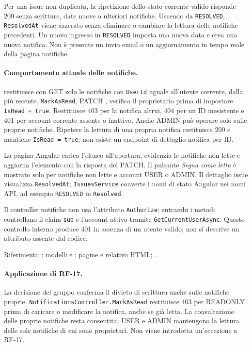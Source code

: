 \documentclass[12pt,a4paper]{article}
\begin{document}
Per una issue non duplicata, la ripetizione dello stato corrente valido risponde 200 senza scritture, date nuove o ulteriori notifiche. Uscendo da \texttt{RESOLVED}, \texttt{ResolvedAt} viene azzerato senza eliminare o cambiare la lettura delle notifiche precedenti. Un nuovo ingresso in \texttt{RESOLVED} imposta una nuova data e crea una nuova notifica. Non è presente un invio email o un aggiornamento in tempo reale della pagina notifiche.

\paragraph{Comportamento attuale delle notifiche.}
 restituisce con GET  solo le notifiche con \texttt{UserId} uguale all'utente corrente, dalla più recente. \texttt{MarkAsRead}, PATCH , verifica il proprietario prima di impostare \texttt{IsRead = true}. Restituisce 403 per la notifica altrui, 404 per un ID inesistente e 401 per account corrente assente o inattivo. Anche ADMIN può operare solo sulle proprie notifiche. Ripetere la lettura di una propria notifica restituisce 200 e mantiene \texttt{IsRead = true}; non esiste un endpoint di dettaglio notifica per ID.

La pagina Angular carica l'elenco all'apertura, evidenzia le notifiche non lette e aggiorna l'elemento con la risposta del PATCH. Il pulsante \emph{Segna come letta} è mostrato solo per notifiche non lette e account USER o ADMIN. Il dettaglio issue visualizza \texttt{ResolvedAt}; \texttt{IssuesService} converte i nomi di stato Angular nei nomi API, ad esempio \texttt{RESOLVED} in \texttt{Resolved}.

Il controller notifiche non usa l'attributo \texttt{Authorize}: entrambi i metodi controllano il claim \texttt{sub} e l'account attivo tramite \texttt{GetCurrentUserAsync}. Questo controllo interno produce 401 in assenza di un utente valido; non si descrive un attributo assente dal codice.

Riferimenti: ; modelli  e ; pagine  e relativo HTML; .

\paragraph{Applicazione di RF-17.}
La decisione del gruppo conferma il divieto di scrittura anche sulle notifiche proprie. \texttt{NotificationsController.MarkAsRead} restituisce 403 per READONLY prima di caricare o modificare la notifica, anche se già letta. La consultazione delle proprie notifiche resta consentita; USER e ADMIN mantengono la lettura delle sole notifiche di cui sono proprietari. Non viene introdotta un'eccezione a RF-17.
\end{document}
